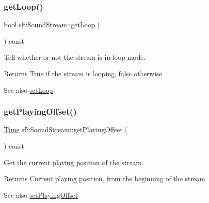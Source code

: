 \subsubsection{\texorpdfstring{getLoop()}{getLoop()}}
{\footnotesize\ttfamily bool sf\+::\+Sound\+Stream\+::get\+Loop (\begin{DoxyParamCaption}{ }\end{DoxyParamCaption}) const}



Tell whether or not the stream is in loop mode. 

\begin{DoxyReturn}{Returns}
True if the stream is looping, false otherwise
\end{DoxyReturn}
\begin{DoxySeeAlso}{See also}
\mbox{\hyperlink{classsf_1_1_sound_stream_a43fade018ffba7e4f847a9f00b353f3d}{set\+Loop}} \begin{DoxyVerb}\end{DoxyVerb}
 
\end{DoxySeeAlso}
\mbox{\label{classsf_1_1_sound_stream_ae288f3c72edbad9cc7ee938ce5b907c1}} 
\subsubsection{\texorpdfstring{getPlayingOffset()}{getPlayingOffset()}}
{\footnotesize\ttfamily \mbox{\hyperlink{classsf_1_1_time}{Time}} sf\+::\+Sound\+Stream\+::get\+Playing\+Offset (\begin{DoxyParamCaption}{ }\end{DoxyParamCaption}) const}



Get the current playing position of the stream. 

\begin{DoxyReturn}{Returns}
Current playing position, from the beginning of the stream
\end{DoxyReturn}
\begin{DoxySeeAlso}{See also}
\mbox{\hyperlink{classsf_1_1_sound_stream_af416a5f84c8750d2acb9821d78bc8646}{set\+Playing\+Offset}} \begin{DoxyVerb}\end{DoxyVerb}
 
\end{DoxySeeAlso}
\mbox{\label{classsf_1_1_sound_stream_a7da448dc40d81a33b8dc555fbf0d3fbf}} 
